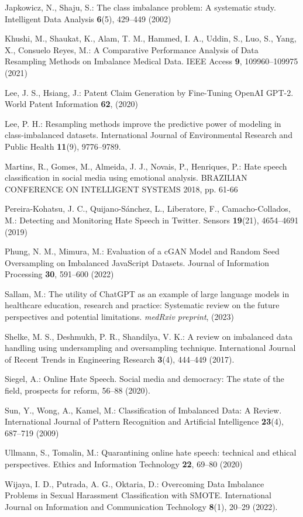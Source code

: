 \documentclass[runningheads]{llncs}
\begin{document}
\begin{thebibliography}{25}
Japkowicz, N., Shaju, S.: The class imbalance problem: A systematic study. Intelligent Data Analysis \textbf{6}(5), 429--449 (2002)

Khushi, M., Shaukat, K., Alam, T. M., Hammed, I. A., Uddin, S., Luo, S., Yang, X., Consuelo Reyes, M.: A Comparative Performance Analysis of Data Resampling Methods on Imbalance Medical Data. IEEE Access \textbf{9}, 109960--109975 (2021)

Lee, J. S., Hsiang, J.: Patent Claim Generation by Fine-Tuning OpenAI GPT-2. World Patent Information \textbf{62}, (2020)

Lee, P. H.: Resampling methods improve the predictive power of modeling in class-imbalanced datasets. International Journal of Environmental Research and Public Health \textbf{11}(9), 9776--9789.

Martins, R., Gomes, M., Almeida, J. J., Novais, P., Henriques, P.: Hate speech classification in social media using emotional analysis. BRAZILIAN CONFERENCE ON INTELLIGENT SYSTEMS 2018, pp. 61-66

Pereira-Kohatsu, J. C., Quijano-Sánchez, L., Liberatore, F., Camacho-Collados, M.: Detecting and Monitoring Hate Speech in Twitter. Sensors \textbf{19}(21), 4654--4691 (2019)

Phung, N. M., Mimura, M.: Evaluation of a cGAN Model and Random Seed Oversampling on Imbalanced JavaScript Datasets. Journal of Information Processing \textbf{30}, 591--600 (2022)

Sallam, M.: The utility of ChatGPT as an example of large language models in healthcare education, research and practice: Systematic review on the future perspectives and potential limitations. \emph{medRxiv preprint}, (2023)

Shelke, M. S., Deshmukh, P. R., Shandilya, V. K.: A review on imbalanced data handling using undersampling and oversampling technique. International Journal of Recent Trends in Engineering Research \textbf{3}(4), 444--449 (2017).

Siegel, A.: Online Hate Speech. Social media and democracy: The state of the field, prospects for reform, 56--88 (2020).

Sun, Y., Wong, A., Kamel, M.: Classification of Imbalanced Data: A Review. International Journal of Pattern Recognition and Artificial Intelligence \textbf{23}(4), 687--719 (2009)

Ullmann, S., Tomalin, M.: Quarantining online hate speech: technical and ethical perspectives. Ethics and Information Technology \textbf{22}, 69--80 (2020)

Wijaya, I. D., Putrada, A. G., Oktaria, D.: Overcoming Data Imbalance Problems in Sexual Harassment Classification with SMOTE. International Journal on Information and Communication Technology \textbf{8}(1), 20--29 (2022).

\end{thebibliography}
\end{document}
